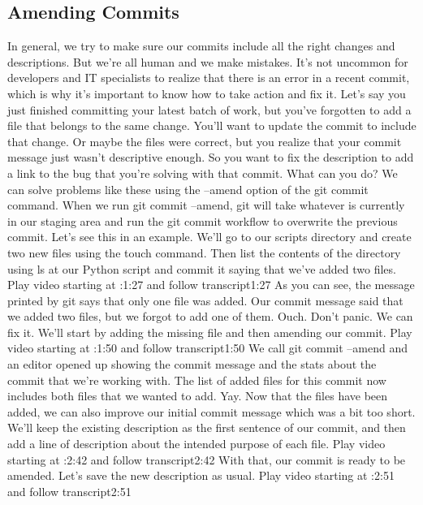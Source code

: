 	\subsection{Amending Commits}
	
	
	In general, we try to make sure our commits include all the right changes and descriptions. But we're all human and we make mistakes. It's not uncommon for developers and IT specialists to realize that there is an error in a recent commit, which is why it's important to know how to take action and fix it. Let's say you just finished committing your latest batch of work, but you've forgotten to add a file that belongs to the same change. You'll want to update the commit to include that change. Or maybe the files were correct, but you realize that your commit message just wasn't descriptive enough. So you want to fix the description to add a link to the bug that you're solving with that commit. What can you do? We can solve problems like these using the --amend option of the git commit command. When we run git commit --amend, git will take whatever is currently in our staging area and run the git commit workflow to overwrite the previous commit. Let's see this in an example. We'll go to our scripts directory and create two new files using the touch command. Then list the contents of the directory using ls at our Python script and commit it saying that we've added two files.
	Play video starting at :1:27 and follow transcript1:27
	As you can see, the message printed by git says that only one file was added. Our commit message said that we added two files, but we forgot to add one of them. Ouch. Don't panic. We can fix it. We'll start by adding the missing file and then amending our commit.
	Play video starting at :1:50 and follow transcript1:50
	We call git commit --amend and an editor opened up showing the commit message and the stats about the commit that we're working with. The list of added files for this commit now includes both files that we wanted to add. Yay. Now that the files have been added, we can also improve our initial commit message which was a bit too short. We'll keep the existing description as the first sentence of our commit, and then add a line of description about the intended purpose of each file.
	Play video starting at :2:42 and follow transcript2:42
	With that, our commit is ready to be amended. Let's save the new description as usual.
	Play video starting at :2:51 and follow transcript2:51
